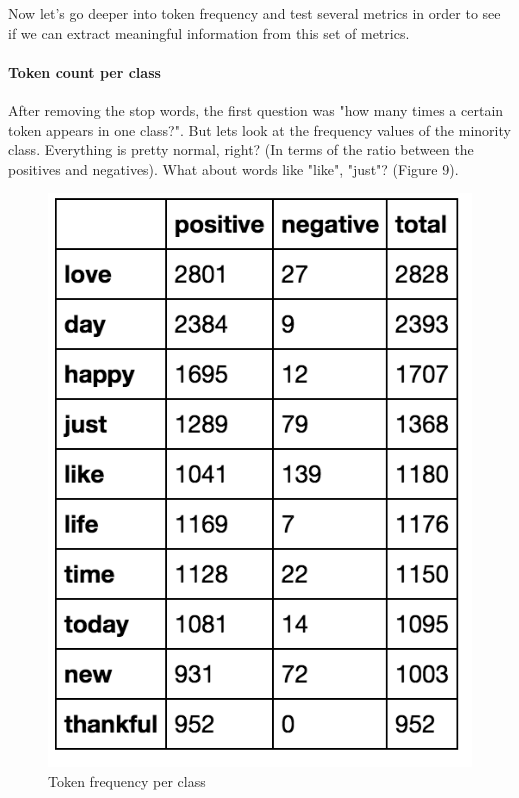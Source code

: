 \documentclass{article}
\begin{document}
	Now let's go deeper into token frequency and test several metrics in order to see if we can extract meaningful information from this set of metrics.
	
	\paragraph{Token count per class}
	
	After removing the stop words, the first question was "how many times a certain token appears in one class?". 
	But lets look at the frequency values of the minority class. Everything is pretty normal, right? (In terms of the ratio between the positives and negatives). What about words like "like", "just"? (Figure 9). 
	
	\begin{figure}[h]
		\label{Figure 9}
		\caption{Token frequency per class}
		\includegraphics[scale=0.5]{freq1.png}
		\centering
	\end{figure}
	
\end{document}
